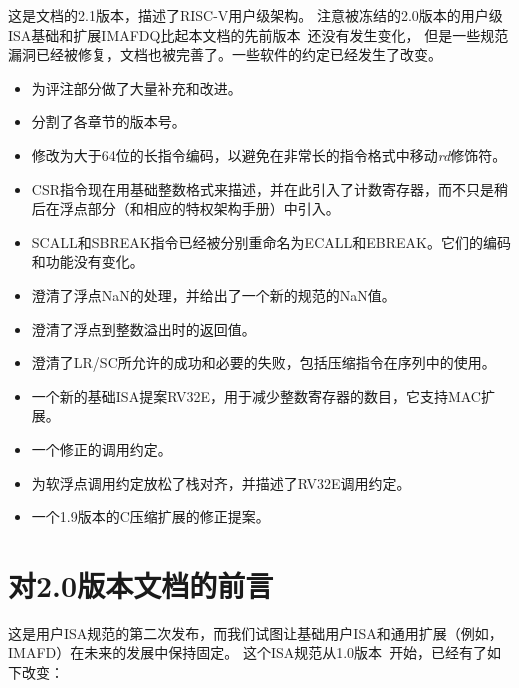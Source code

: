 这是文档的2.1版本，描述了RISC-V用户级架构。
注意被冻结的2.0版本的用户级ISA基础和扩展IMAFDQ比起本文档的先前版本~\cite{riscvtr2}还没有发生变化，
但是一些规范漏洞已经被修复，文档也被完善了。一些软件的约定已经发生了改变。
\begin{itemize}
\parskip 0pt
\itemsep 1pt
\item 为评注部分做了大量补充和改进。
\item 分割了各章节的版本号。
\item 修改为大于64位的长指令编码，以避免在非常长的指令格式中移动{\em rd}修饰符。
\item CSR指令现在用基础整数格式来描述，并在此引入了计数寄存器，而不只是稍后在浮点部分（和相应的特权架构手册）中引入。
\item SCALL和SBREAK指令已经被分别重命名为ECALL和EBREAK。它们的编码和功能没有变化。
\item 澄清了浮点NaN的处理，并给出了一个新的规范的NaN值。
\item 澄清了浮点到整数溢出时的返回值。
\item 澄清了LR/SC所允许的成功和必要的失败，包括压缩指令在序列中的使用。
\item 一个新的基础ISA提案RV32E，用于减少整数寄存器的数目，它支持MAC扩展。
\item 一个修正的调用约定。
\item 为软浮点调用约定放松了栈对齐，并描述了RV32E调用约定。
\item 一个1.9版本的C压缩扩展的修正提案。
\end{itemize}

\section*{对2.0版本文档的前言}

这是用户ISA规范的第二次发布，而我们试图让基础用户ISA和通用扩展（例如，IMAFD）在未来的发展中保持固定。
这个ISA规范从1.0版本~\cite{riscvtr}开始，已经有了如下改变：

